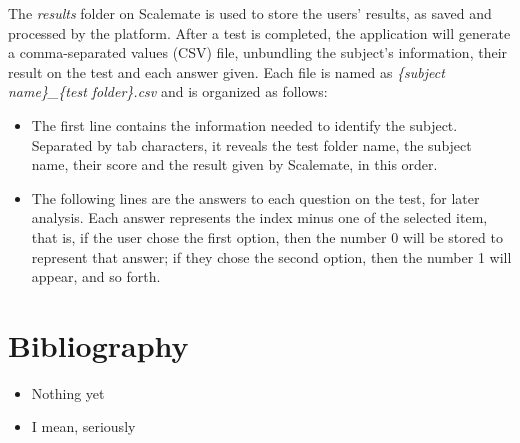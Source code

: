 \documentclass[12pt, a4paper, twoside]{article}
\begin{document}
The \textit{results} folder on Scalemate is used to store the users' results, as saved and processed by the platform. After a test is completed, the application will generate a comma-separated values (CSV) file, unbundling the subject's information, their result on the test and each answer given. Each file is named as \textit{\{subject name\}\_\{test folder\}.csv} and is organized as follows:

\begin{itemize}
\item The first line contains the information needed to identify the subject. Separated by tab characters, it reveals the test folder name, the subject name, their score and the result given by Scalemate, in this order.
\item The following lines are the answers to each question on the test, for later analysis. Each answer represents the index minus one of the selected item, that is, if the user chose the first option, then the number 0 will be stored to represent that answer; if they chose the second option, then the number 1 will appear, and so forth.
\end{itemize}


\section{Bibliography}

\begin{itemize}
	\item Nothing yet
	\item I mean, seriously
\end{itemize}
\end{document}
